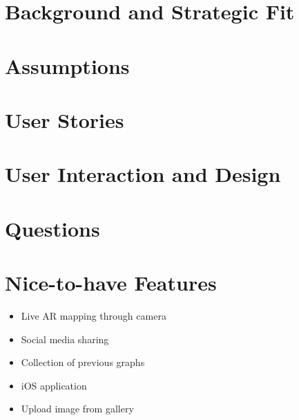 \documentclass[a4paper,12pt]{article}
\begin{document}
\newpage
\section{Background and Strategic Fit} %

\newpage
\section{Assumptions} %

\newpage
\section{User Stories} %

\newpage
\section{User Interaction and Design} %

\newpage
\section{Questions} %

\newpage
\section{Nice-to-have Features} %
\begin{itemize}
\item Live AR mapping through camera
\item Social media sharing
\item Collection of previous graphs
\item iOS application
\item Upload image from gallery
\end{itemize}
\end{document}
